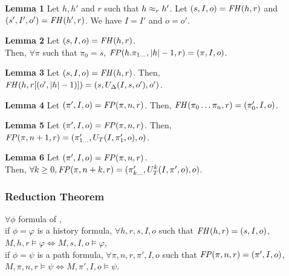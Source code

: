 \textbf{Lemma 1}
Let $h,h'$ and $r$ such that $h\approx_{r}h'$. Let $(s,I,o)=\mathit{FH}(h,r)$ and $(s',I',o')=\mathit{FH}(h',r)$. We have $I=I'$ and $o=o'$.

\textbf{Lemma 2}
Let $(s,I,o)=\mathit{FH}(h,r)$.\\ Then, $\forall\pi$ such that $\pi_0=s$, $\mathit{FP}(h.\pi_{1\dots},|h|-1,r)=(\pi,I,o)$.

\textbf{Lemma 3}
Let $(s,I,o)=\mathit{FH}(h,r)$. Then, $\mathit{FH}(h,r[(o',|h|-1)])=(s,U_{\Delta}(I,s,o'),o')$.

\textbf{Lemma 4}
Let $(\pi',I,o)=\mathit{FP}(\pi,n,r)$. Then, $\mathit{FH}(\pi_0\dots\pi_n,r)=(\pi'_0,I,o)$.

\textbf{Lemma 5}
Let $(\pi',I,o)=\mathit{FP}(\pi,n,r)$. Then, $\mathit{FP}(\pi,n+1,r)=(\pi'_{1\dots},U_T(I,\pi'_1,o),o)$.

\textbf{Lemma 6}
Let $(\pi',I,o)=\mathit{FP}(\pi,n,r)$.\\ Then, $\forall k\geq 0, \mathit{FP}(\pi,n+k,r)=(\pi'_{k\dots},U_T^k(I,\pi',o),o)$.

\subsubsection{Reduction Theorem}
$\forall\phi$ formula of \ctlskd,\\
if $\phi=\varphi$ is a history formula, $\forall h,r,s,I,o$ such that $\mathit{FH}(h,r)=(s,I,o)$,\\ $M,h,r\models\varphi\iff M,s,I,o\models\varphi$,\\
if $\phi=\psi$ is a path formula, $\forall \pi,n,r,\pi',I,o$ such that $\mathit{FP}(\pi,n,r)=(\pi',I,o)$,\\ $M,\pi,n,r\models\psi\iff M,\pi',I,o\models\psi$.

